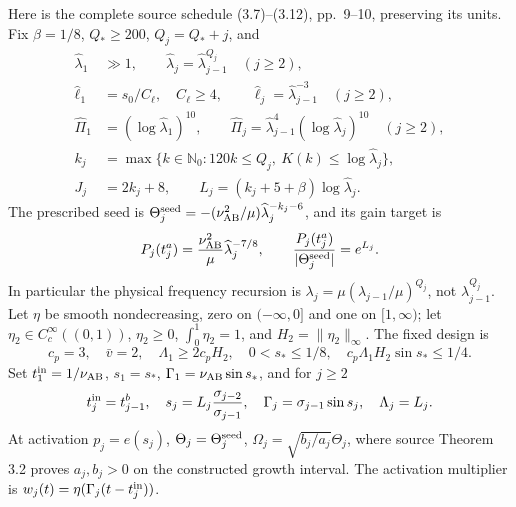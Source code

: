Here is the complete source schedule (3.7)--(3.12), pp.~9--10, preserving its units. Fix $\beta=1/8$, $Q_*\ge200$, $Q_j=Q_*+j$, and
\begin{align}
 \widehat\lambda_1&\gg1,\qquad\widehat\lambda_j=\widehat\lambda_{j-1}^{Q_j}\quad(j\ge2),\label{pc:eq:schedule}\\
 \widehat\ell_1&=s_0/C_\ell,\quad C_\ell\ge4,\qquad\widehat\ell_j=\widehat\lambda_{j-1}^{-3}\quad(j\ge2),\nonumber\\
 \widehat\Pi_1&=(\log\widehat\lambda_1)^{10},\qquad
 \widehat\Pi_j=\widehat\lambda_{j-1}^{4}(\log\widehat\lambda_j)^{10}\quad(j\ge2),\nonumber\\
 k_j&=\max\{k\in\mathbb N_0:120k\le Q_j,\ K(k)\le\log\widehat\lambda_j\},\nonumber\\
 J_j&=2k_j+8,\qquad L_j=(k_j+5+\beta)\log\widehat\lambda_j.\nonumber
\end{align}
The prescribed seed is $\Theta_j^{\rm seed}=-(\nu_{\mathrm{AB}}^2/\mu)\widehat\lambda_j^{-k_j-6}$, and its gain target is
\[
 P_j(t_j^a)=\frac{\nu_{\mathrm{AB}}^2}{\mu}\widehat\lambda_j^{-7/8},
 \qquad \frac{P_j(t_j^a)}{|\Theta_j^{\rm seed}|}=e^{L_j}.
\]
In particular the physical frequency recursion is $\lambda_j=\mu(\lambda_{j-1}/\mu)^{Q_j}$, not $\lambda_{j-1}^{Q_j}$.
Let $\eta$ be smooth nondecreasing, zero on $(-\infty,0]$ and one on $[1,\infty)$; let $\eta_2\in C_c^\infty((0,1))$, $\eta_2\ge0$, $\int_0^1\eta_2=1$, and $H_2=\|\eta_2\|_\infty$. The fixed design is
\[
 c_p=3,\quad\bar v=2,\quad\Lambda_1\ge2c_pH_2,\quad
 0<s_*\le1/8,\quad c_p\Lambda_1H_2\sin s_*\le1/4.
\]
Set $t_1^{\rm in}=1/\nu_{\mathrm{AB}}$, $s_1=s_*$, $\Gamma_1=\nu_{\mathrm{AB}}\sin s_*$, and for $j\ge2$
\[
 t_j^{\rm in}=t_{j-1}^b,\quad s_j=L_j\frac{\sigma_{j-2}}{\sigma_{j-1}},\quad
 \Gamma_j=\sigma_{j-1}\sin s_j,\quad\Lambda_j=L_j.
\]
At activation $p_j=e(s_j)$, $\Theta_j=\Theta_j^{\rm seed}$, $\Omega_j=\sqrt{b_j/a_j}\Theta_j$, where source Theorem 3.2 proves $a_j,b_j>0$ on the constructed growth interval. The activation multiplier is $w_j(t)=\eta(\Gamma_j(t-t_j^{\rm in}))$.
